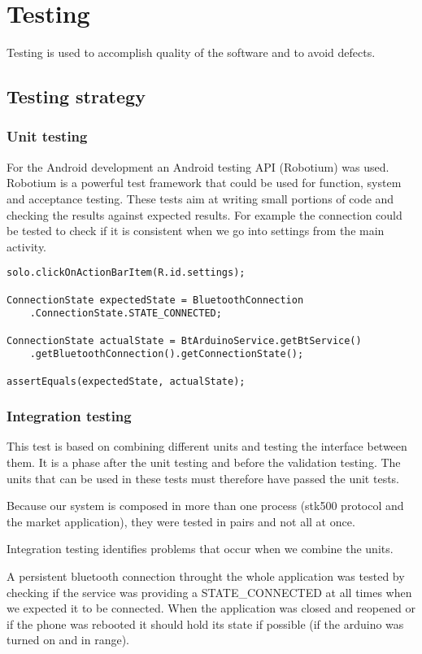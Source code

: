 \chapter{Testing}
	Testing is used to accomplish quality of the software and to avoid defects.
	
	\section{Testing strategy}
		\subsection{Unit testing}
			For the Android development an Android testing API (Robotium) was used.
			Robotium is a powerful test framework that could be used for function, system and acceptance testing.
			These tests aim at writing small portions of code and checking the results against expected results.
			For example the connection could be tested to check if it is consistent when we go into settings from the main activity.\\

			\begin{lstlisting}
solo.clickOnActionBarItem(R.id.settings);

ConnectionState expectedState = BluetoothConnection
	.ConnectionState.STATE_CONNECTED;
	
ConnectionState actualState = BtArduinoService.getBtService()
	.getBluetoothConnection().getConnectionState();

assertEquals(expectedState, actualState);
			\end{lstlisting}

		\subsection{Integration testing}
			This test is based on combining different units and testing the interface between them. It is a phase after the unit testing and before the validation testing. The units that can be used in these tests must therefore have passed the unit tests.

			Because our system is composed in more than one process (stk500 protocol and the market application), they
			were tested in pairs and not all at once.

			Integration testing identifies problems that occur when we combine the units.

			A persistent bluetooth connection throught the whole application was tested by checking if the service was providing a STATE\_CONNECTED at all times when we expected it to be connected. When the application was closed and reopened or if the phone was rebooted it should hold its state if possible (if the arduino was turned on and in range). 

